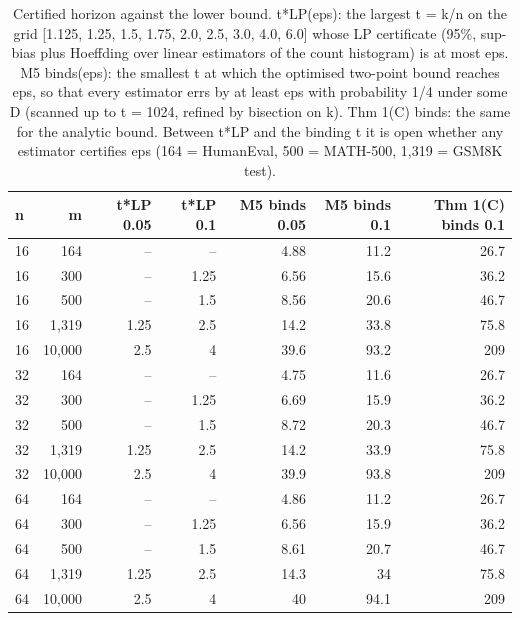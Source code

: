 \begin{table}[t]
\centering
\small
\begin{tabular}{lrrrrrr}
\toprule
n & m & t*LP 0.05 & t*LP 0.1 & M5 binds 0.05 & M5 binds 0.1 & Thm 1(C) binds 0.1 \\
\midrule
16 & 164 & -- & -- & 4.88 & 11.2 & 26.7 \\
16 & 300 & -- & 1.25 & 6.56 & 15.6 & 36.2 \\
16 & 500 & -- & 1.5 & 8.56 & 20.6 & 46.7 \\
16 & 1,319 & 1.25 & 2.5 & 14.2 & 33.8 & 75.8 \\
16 & 10,000 & 2.5 & 4 & 39.6 & 93.2 & 209 \\
32 & 164 & -- & -- & 4.75 & 11.6 & 26.7 \\
32 & 300 & -- & 1.25 & 6.69 & 15.9 & 36.2 \\
32 & 500 & -- & 1.5 & 8.72 & 20.3 & 46.7 \\
32 & 1,319 & 1.25 & 2.5 & 14.2 & 33.9 & 75.8 \\
32 & 10,000 & 2.5 & 4 & 39.9 & 93.8 & 209 \\
64 & 164 & -- & -- & 4.86 & 11.2 & 26.7 \\
64 & 300 & -- & 1.25 & 6.56 & 15.9 & 36.2 \\
64 & 500 & -- & 1.5 & 8.61 & 20.7 & 46.7 \\
64 & 1,319 & 1.25 & 2.5 & 14.3 & 34 & 75.8 \\
64 & 10,000 & 2.5 & 4 & 40 & 94.1 & 209 \\
\bottomrule
\end{tabular}
\caption{Certified horizon against the lower bound. t*LP(eps): the largest t = k/n on the grid [1.125, 1.25, 1.5, 1.75, 2.0, 2.5, 3.0, 4.0, 6.0] whose LP certificate (95\%, sup-bias plus Hoeffding over linear estimators of the count histogram) is at most eps. M5 binds(eps): the smallest t at which the optimised two-point bound reaches eps, so that every estimator errs by at least eps with probability 1/4 under some D (scanned up to t = 1024, refined by bisection on k). Thm 1(C) binds: the same for the analytic bound. Between t*LP and the binding t it is open whether any estimator certifies eps (164 = HumanEval, 500 = MATH-500, 1,319 = GSM8K test).}
\label{tab:T10_certified_horizons}
\end{table}
